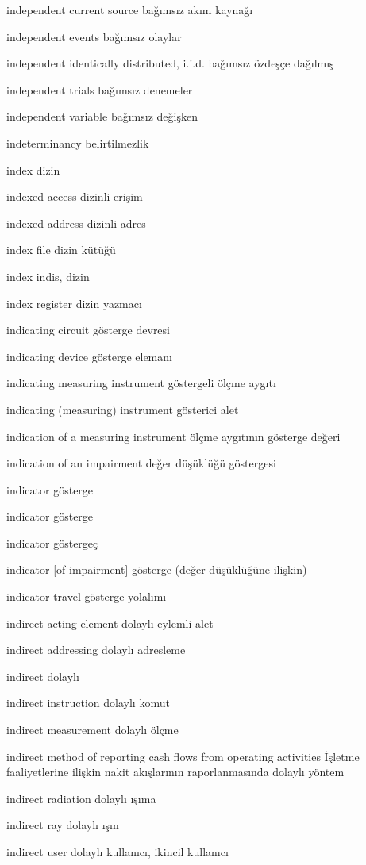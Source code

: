 \documentclass[12pt,fleqn]{article}\usepackage{../../common}
\begin{document}
independent current source bağımsız akım kaynağı

independent events bağımsız olaylar

independent identically distributed, i.i.d. bağımsız özdeşçe dağılmış

independent trials bağımsız denemeler

independent variable bağımsız değişken

indeterminancy belirtilmezlik

index dizin

indexed access dizinli erişim

indexed address dizinli adres

index file dizin kütüğü

index indis, dizin

index register dizin yazmacı

indicating circuit gösterge devresi

indicating device gösterge elemanı

indicating measuring instrument göstergeli ölçme aygıtı

indicating (measuring) instrument gösterici alet

indication of a measuring instrument ölçme aygıtının gösterge değeri

indication of an impairment değer düşüklüğü göstergesi

indicator gösterge

indicator gösterge

indicator göstergeç

indicator [of impairment] gösterge (değer düşüklüğüne ilişkin)

indicator travel gösterge yolalımı

indirect acting element dolaylı eylemli alet

indirect addressing dolaylı adresleme

indirect dolaylı

indirect instruction dolaylı komut

indirect measurement dolaylı ölçme

indirect method of reporting cash flows from operating activities İşletme faaliyetlerine ilişkin nakit akışlarının raporlanmasında dolaylı yöntem

indirect radiation dolaylı ışıma

indirect ray dolaylı ışın

indirect user dolaylı kullanıcı, ikincil kullanıcı
\end{document}
